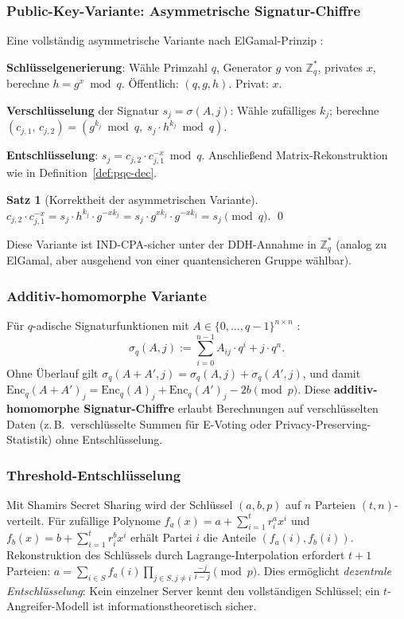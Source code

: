 ﻿\documentclass[a4paper,12pt]{article}
\theoremstyle{definition}
\newtheorem{satz}{Satz}[section]
\begin{document}
\subsubsection{Public-Key-Variante: Asymmetrische Signatur-Chiffre}

Eine vollständig asymmetrische Variante nach ElGamal-Prinzip \cite{Epp26b}:

\textbf{Schlüsselgenerierung}: Wähle Primzahl $q$, Generator $g$ von $\mathbb{Z}_q^*$,
privates $x$, berechne $h = g^x \bmod q$. Öffentlich: $(q, g, h)$. Privat: $x$.

\textbf{Verschlüsselung} der Signatur $s_j = \sigma(A,j)$:
Wähle zufälliges $k_j$; berechne
$(c_{j,1},\, c_{j,2}) = (g^{k_j} \bmod q,\; s_j \cdot h^{k_j} \bmod q)$.

\textbf{Entschlüsselung}: $s_j = c_{j,2} \cdot c_{j,1}^{-x} \bmod q$.
Anschließend Matrix-Rekonstruktion wie in Definition~\ref{def:pqc-dec}.

\begin{satz}[Korrektheit der asymmetrischen Variante]
$c_{j,2} \cdot c_{j,1}^{-x} = s_j \cdot h^{k_j} \cdot g^{-xk_j}
= s_j \cdot g^{xk_j} \cdot g^{-xk_j} = s_j \pmod{q}$. \qed
\end{satz}

Diese Variante ist IND-CPA-sicher unter der DDH-Annahme in $\mathbb{Z}_q^*$
(analog zu ElGamal, aber ausgehend von einer quantensicheren Gruppe wählbar).

\subsubsection{Additiv-homomorphe Variante}

Für $q$-adische Signaturfunktionen mit $A \in \{0,\ldots,q-1\}^{n \times n}$
\cite{Epp26b}:
\[
  \sigma_q(A, j) := \sum_{i=0}^{n-1} A_{ij} \cdot q^i + j \cdot q^n.
\]
Ohne Überlauf gilt $\sigma_q(A + A', j) = \sigma_q(A,j) + \sigma_q(A',j)$,
und damit
$\mathrm{Enc}_q(A + A')_j = \mathrm{Enc}_q(A)_j + \mathrm{Enc}_q(A')_j - 2b \pmod{p}$.
Diese \textbf{additiv-homomorphe Signatur-Chiffre} erlaubt Berechnungen auf
verschlüsselten Daten (z.\,B.\ verschlüsselte Summen für E-Voting oder
Privacy-Preserving-Statistik) ohne Entschlüsselung.

\subsubsection{Threshold-Entschlüsselung}

Mit Shamirs Secret Sharing \cite{Sha79} wird der Schlüssel $(a, b, p)$ auf
$n$ Parteien $(t,n)$-verteilt. Für zufällige Polynome
$f_a(x) = a + \sum_{i=1}^t r_i^a x^i$ und $f_b(x) = b + \sum_{i=1}^t r_i^b x^i$
erhält Partei $i$ die Anteile $(f_a(i), f_b(i))$.
Rekonstruktion des Schlüssels durch Lagrange-Interpolation erfordert $t+1$ Parteien:
$a = \sum_{i \in S} f_a(i) \prod_{j \in S, j \neq i} \frac{-j}{i-j} \pmod{p}$.
Dies ermöglicht \emph{dezentrale Entschlüsselung}: Kein einzelner Server kennt
den vollständigen Schlüssel; ein $t$-Angreifer-Modell ist informationstheoretisch
sicher.
\end{document}
